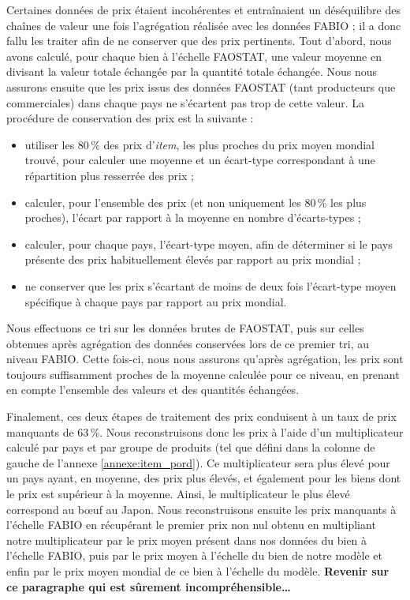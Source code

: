Certaines données de prix étaient incohérentes et entraînaient un déséquilibre des chaînes de valeur une fois l'agrégation réalisée avec les données FABIO ; il a donc fallu les traiter afin de ne conserver que des prix pertinents. Tout d'abord, nous avons calculé, pour chaque bien à l'échelle FAOSTAT, une valeur moyenne en divisant la valeur totale échangée par la quantité totale échangée. Nous nous assurons ensuite que les prix issus des données FAOSTAT (tant producteurs que commerciales) dans chaque pays ne s'écartent pas trop de cette valeur. La procédure de conservation des prix est la suivante :
\begin{itemize}
    \item utiliser les 80\,\% des prix d'\textit{item}, les plus proches du prix moyen mondial trouvé, pour calculer une moyenne et un écart-type correspondant à une répartition plus resserrée des prix ;
    \item calculer, pour l'ensemble des prix (et non uniquement les 80\,\% les plus proches), l'écart par rapport à la moyenne en nombre d’écarts-types ;
    \item calculer, pour chaque pays, l'écart-type moyen, afin de déterminer si le pays présente des prix habituellement élevés par rapport au prix mondial ;
    \item ne conserver que les prix s'écartant de moins de deux fois l'écart-type moyen spécifique à chaque pays par rapport au prix mondial.
\end{itemize}
Nous effectuons ce tri sur les données brutes de FAOSTAT, puis sur celles obtenues après agrégation des données conservées lors de ce premier tri, au niveau FABIO. Cette fois-ci, nous nous assurons qu'après agrégation, les prix sont toujours suffisamment proches de la moyenne calculée pour ce niveau, en prenant en compte l'ensemble des valeurs et des quantités échangées.

Finalement, ces deux étapes de traitement des prix conduisent à un taux de prix manquants de 63\,\%. Nous reconstruisons donc les prix à l'aide d'un multiplicateur calculé par pays et par groupe de produits (tel que défini dans la colonne de gauche de l'annexe \ref{annexe:item_pord}). Ce multiplicateur sera plus élevé pour un pays ayant, en moyenne, des prix plus élevés, et également pour les biens dont le prix est supérieur à la moyenne. Ainsi, le multiplicateur le plus élevé correspond au bœuf au Japon. Nous reconstruisons ensuite les prix manquants à l'échelle FABIO en récupérant le premier prix non nul obtenu en multipliant notre multiplicateur par le prix moyen présent dans nos données du bien à l'échelle FABIO, puis par le prix moyen à l'échelle du bien de notre modèle et enfin par le prix moyen mondial de ce bien à l'échelle du modèle. \textbf{Revenir sur ce paragraphe qui est sûrement incompréhensible\dots}


